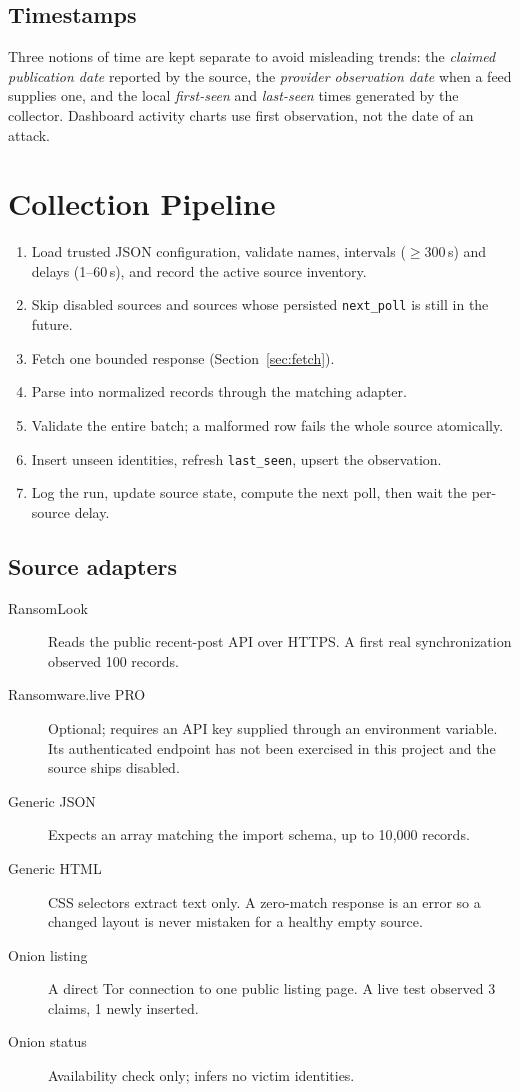 \documentclass[11pt,a4paper]{article}
\newcommand{\code}[1]{\texttt{\small #1}}
\begin{document}
\subsection{Timestamps}
Three notions of time are kept separate to avoid misleading trends: the \emph{claimed publication date} reported by the source, the \emph{provider observation date} when a feed supplies one, and the local \emph{first-seen} and \emph{last-seen} times generated by the collector. Dashboard activity charts use first observation, not the date of an attack.

\section{Collection Pipeline}
\begin{enumerate}
  \item Load trusted JSON configuration, validate names, intervals ($\ge 300$\,s) and delays (1--60\,s), and record the active source inventory.
  \item Skip disabled sources and sources whose persisted \code{next\_poll} is still in the future.
  \item Fetch one bounded response (Section~\ref{sec:fetch}).
  \item Parse into normalized records through the matching adapter.
  \item Validate the entire batch; a malformed row fails the whole source atomically.
  \item Insert unseen identities, refresh \code{last\_seen}, upsert the observation.
  \item Log the run, update source state, compute the next poll, then wait the per-source delay.
\end{enumerate}

\subsection{Source adapters}
\begin{description}
  \item[RansomLook] Reads the public recent-post API over HTTPS. A first real synchronization observed 100 records.
  \item[Ransomware.live PRO] Optional; requires an API key supplied through an environment variable. Its authenticated endpoint has not been exercised in this project and the source ships disabled.
  \item[Generic JSON] Expects an array matching the import schema, up to 10{,}000 records.
  \item[Generic HTML] CSS selectors extract text only. A zero-match response is an error so a changed layout is never mistaken for a healthy empty source.
  \item[Onion listing] A direct Tor connection to one public listing page. A live test observed 3 claims, 1 newly inserted.
  \item[Onion status] Availability check only; infers no victim identities.
\end{description}
\end{document}
